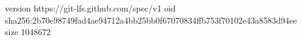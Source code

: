 version https://git-lfs.github.com/spec/v1
oid sha256:2b70e98749fad4ae94712a4bb25bb0f67070834ffb753f70102e43a8583d94ee
size 1048672
